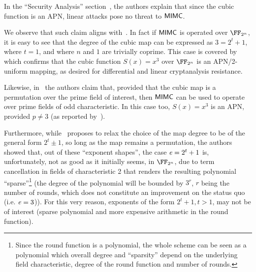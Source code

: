 In the ``Security Analysis'' section~\cite[Section 4.2]{albrecht2016mimc}, the authors explain that since the cubic function is an APN, linear attacks pose no threat to $\mathsf{MIMC{}}$.

We observe that such claim aligns with~\cite[Theorem 2]{DBLP:journals/tit/HellesethRS99}. In fact if $\mathsf{MIMC{}}$ is operated over $\FF_{2^n}$, it is easy to see that the degree of the cubic map can be expressed as $3 = 2^t + 1$, where $t = 1$, and where $n$ and $1$ are trivially coprime. This case is covered by~\cite[Theorem 2]{DBLP:journals/tit/HellesethRS99} which confirms that the cubic function $S(x) = x^3$ over $\FF_{2^n}$ is an APN/2-uniform mapping, as desired for differential and linear cryptanalysis resistance.

Likewise, in~\cite[Section 5.1]{albrecht2016mimc} the authors claim that, provided that the cubic map is a permutation over the prime field of interest, then $\mathsf{MIMC{}}$ can be used to operate over prime fields of odd characteristic. In this case too, $S(x) = x^3$ is an APN, provided $p \neq 3$ (as reported by~\cite[Theorem 3, item 3]{DBLP:journals/tit/HellesethRS99}).

Furthermore, while~\cite[Section 5.3]{albrecht2016mimc} proposes to relax the choice of the map degree to be of the general form $2^t \pm 1$, so long as the map remains a permutation, the authors showed that, out of these ``exponent shapes'', the case $\mathit{e}{} = 2^t + 1$ is, unfortunately, not as good as it initially seems, in $\FF_{2^n}$, due to term cancellation in fields of characteristic 2 that renders the resulting polynomial ``sparse''\footnote{Since the round function is a polynomial, the whole scheme can be seen as a polynomial which overall degree and ``sparsity'' depend on the underlying field characteristic, degree of the round function and number of rounds.} (the degree of the polynomial will be bounded by $3^r$, $r$ being the number of rounds, which does not constitute an improvement on the status quo (i.e. $\mathit{e}{} = 3$)). For this very reason, exponents of the form $2^t + 1, t > 1$, may not be of interest (sparse polynomial and more expensive arithmetic in the round function).


